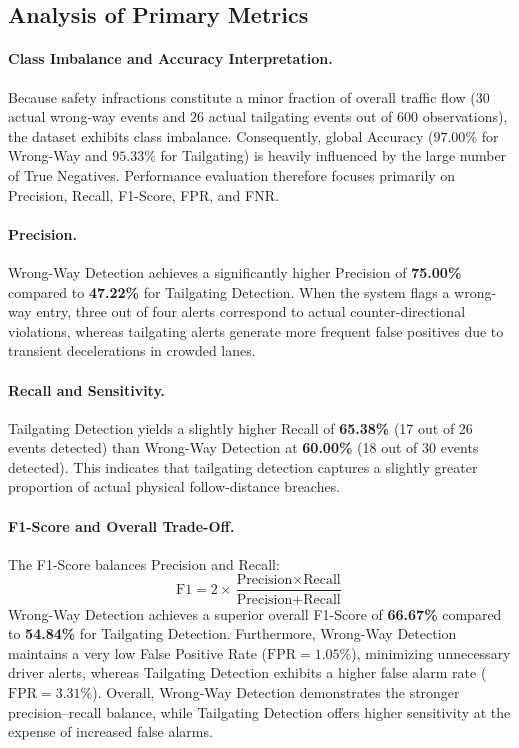 \documentclass[12pt,a4paper]{report}
\begin{document}
\subsection{Analysis of Primary Metrics}

\paragraph{Class Imbalance and Accuracy Interpretation.}
Because safety infractions constitute a minor fraction of overall traffic flow ($30$ actual wrong-way events and $26$ actual tailgating events out of 600 observations), the dataset exhibits class imbalance. Consequently, global Accuracy ($97.00\%$ for Wrong-Way and $95.33\%$ for Tailgating) is heavily influenced by the large number of True Negatives. Performance evaluation therefore focuses primarily on Precision, Recall, F1-Score, FPR, and FNR.

\paragraph{Precision.}
Wrong-Way Detection achieves a significantly higher Precision of \textbf{75.00\%} compared to \textbf{47.22\%} for Tailgating Detection. When the system flags a wrong-way entry, three out of four alerts correspond to actual counter-directional violations, whereas tailgating alerts generate more frequent false positives due to transient decelerations in crowded lanes.

\paragraph{Recall and Sensitivity.}
Tailgating Detection yields a slightly higher Recall of \textbf{65.38\%} (17 out of 26 events detected) than Wrong-Way Detection at \textbf{60.00\%} (18 out of 30 events detected). This indicates that tailgating detection captures a slightly greater proportion of actual physical follow-distance breaches.

\paragraph{F1-Score and Overall Trade-Off.}
The F1-Score balances Precision and Recall:
\begin{equation}
    \text{F1} = 2 \times \frac{\text{Precision} \times \text{Recall}}{\text{Precision} + \text{Recall}}
\end{equation}
Wrong-Way Detection achieves a superior overall F1-Score of \textbf{66.67\%} compared to \textbf{54.84\%} for Tailgating Detection. Furthermore, Wrong-Way Detection maintains a very low False Positive Rate ($\text{FPR} = 1.05\%$), minimizing unnecessary driver alerts, whereas Tailgating Detection exhibits a higher false alarm rate ($\text{FPR} = 3.31\%$). Overall, Wrong-Way Detection demonstrates the stronger precision--recall balance, while Tailgating Detection offers higher sensitivity at the expense of increased false alarms.
\end{document}
